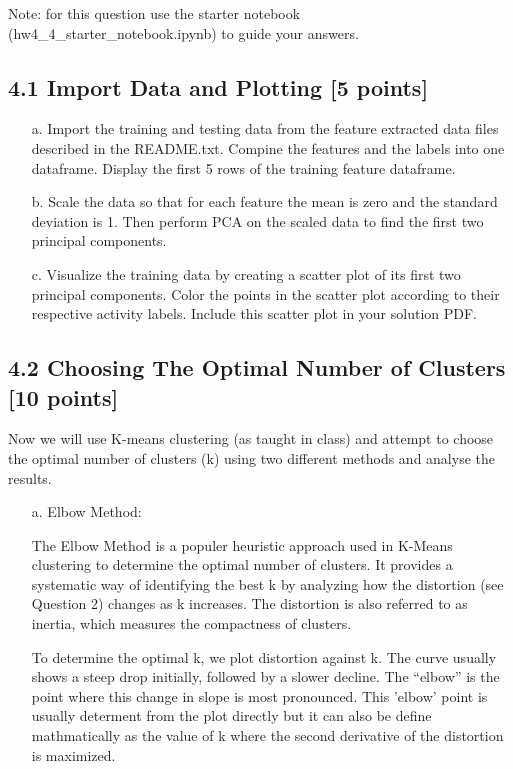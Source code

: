 \documentclass[a3paper,12pt]{extarticle} %
\begin{document}
\begin{enumerate}
Note: for this question use the starter notebook (hw4\_4\_starter\_notebook.ipynb) to guide your answers.

\subsection*{4.1 Import Data and Plotting [5 points]}
\begin{itemize}
\item[a.] Import the training and testing data from the feature extracted data files described in the README.txt. Compine the features and the labels into one dataframe. Display the first 5 rows of the training feature dataframe.
\item[b.] Scale the data so that for each feature the mean is zero and the standard deviation is 1. Then perform PCA on the scaled data to find the first two principal components.
\item[c.] Visualize the training data by creating a scatter plot of its first two principal components. Color the points in the scatter plot according to their respective activity labels. Include this scatter plot in your solution PDF.
\end{itemize}

\subsection*{4.2 Choosing The Optimal Number of Clusters [10 points]}
Now we will use K-means clustering (as taught in class) and attempt to choose the optimal number of clusters (k) using two different methods and analyse the results.

\begin{itemize}
\item[a.] Elbow Method:

The Elbow Method is a populer heuristic approach used in K-Means clustering to determine the optimal number of clusters. It provides a systematic way of identifying the best k by analyzing how the distortion (see Question 2) changes as k increases. The distortion is also referred to as inertia, which measures the compactness of clusters.

To determine the optimal k, we plot distortion against k. The curve usually shows a steep drop initially, followed by a slower decline. The ``elbow'' is the point where this change in slope is most pronounced. This 'elbow' point is usually determent from the plot directly but it can also be define mathmatically as the value of k where the second derivative of the distortion is maximized.


\end{itemize}
\end{enumerate}
\end{document}
